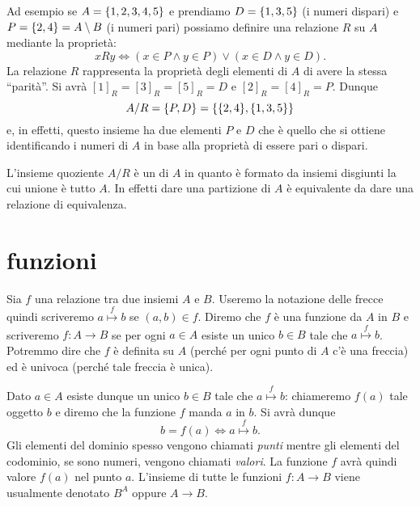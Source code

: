 Ad esempio se $A={\left\{ 1,2,3,4,5 \right\}}$ e prendiamo $D={\left\{ 1,3,5 \right\}}$ (i numeri dispari)
e $P={\left\{ 2,4 \right\}}=A\setminus B$ 
(i numeri pari) possiamo definire una relazione $R$ su $A$ mediante la proprietà:
\[
 x R  y \iff (x\in P \land y\in P) \lor (x\in D \land y\in D).
\]
La relazione $R$ rappresenta la proprietà degli elementi di $A$ 
di avere la stessa ``parità''. 
Si avrà $[1]_R = [3]_R=[5]_R= D$ e $[2]_R=[4]_R=P$.
Dunque 
\[
   A/R = {\left\{ P,D \right\}} = {\left\{ {\left\{ 2,4 \right\}},{\left\{ 1,3,5 \right\}} \right\}}
\]
e, in effetti, questo insieme ha due elementi $P$ e $D$ che è quello 
che si ottiene identificando i numeri di $A$ in base alla proprietà 
di essere pari o dispari. 

L'insieme quoziente $A/R$ è un  di $A$ in quanto 
è formato da insiemi disgiunti la cui unione è tutto $A$. In effetti 
dare una partizione di $A$ è equivalente da dare una relazione 
di equivalenza.

\section{funzioni}

Sia $f$ una relazione tra due insiemi $A$ e $B$. 
Useremo la notazione delle frecce quindi scriveremo $a\stackrel f\mapsto b$ 
se $(a,b)\in f$. 
Diremo che $f$ è una funzione da $A$ in $B$ e scriveremo 
$f\colon A\to B$ se per ogni $a\in A$ esiste un unico $b\in B$ 
tale che $a \stackrel f \mapsto b$.
Potremmo dire che $f$ è definita su $A$ 
(perché per ogni punto di $A$ c'è una freccia)
ed è univoca (perché tale freccia è unica).

Dato $a\in A$ esiste dunque un unico $b\in B$ tale che
$a\stackrel f \mapsto b$: chiameremo $f(a)$ tale oggetto $b$
e diremo che la funzione $f$ manda $a$ in $b$. 
Si avrà dunque
\[
 b=f(a) \iff a\stackrel f \mapsto b.
\]
Gli elementi del dominio spesso vengono chiamati \emph{punti}
mentre gli elementi del codominio, se sono numeri, vengono 
chiamati \emph{valori}. 
La funzione $f$ avrà quindi valore $f(a)$ nel punto $a$.
L'insieme di tutte le funzioni $f\colon A\to B$ viene usualmente denotato $B^A$
oppure $A\to B$.
%
%
%
%

